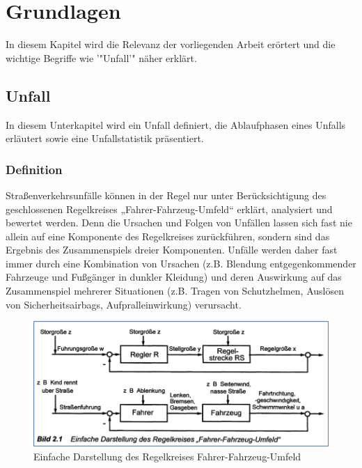 \chapter{Grundlagen}
In diesem Kapitel wird die Relevanz der vorliegenden Arbeit erörtert und die wichtige Begriffe wie '"Unfall'" näher erklärt.

%
%
\section{Unfall}
In diesem Unterkapitel wird ein Unfall definiert, die Ablaufphasen eines Unfalls erläutert sowie eine Unfallstatistik präsentiert.
%
%
%
%
\subsection{Definition}
Straßenverkehrsunfälle können in der Regel nur unter Berücksichtigung des geschlossenen Regelkreises „Fahrer-Fahrzeug-Umfeld“ erklärt, analysiert und bewertet werden. Denn die Ursachen und Folgen von Unfällen lassen sich fast nie allein auf eine Komponente des Regelkreises zurückführen, sondern sind das Ergebnis des Zusammenspiels dreier Komponenten. Unfälle werden daher fast immer durch eine Kombination von Ursachen (z.B. Blendung entgegenkommender Fahrzeuge und Fußgänger in dunkler Kleidung) und deren Auswirkung auf das Zusammenspiel mehrerer Situationen (z.B. Tragen von Schutzhelmen, Auslösen von Sicherheitsairbags, Aufpralleinwirkung) verursacht. \citep{Appel2002}

\begin{figure}[H]
	\centering
	\includegraphics[width=\linewidth]{Bilder/FahrenRegelkreis.png}
	\caption{Einfache Darstellung des Regelkreises 	\glqq Fahrer-Fahrzeug-Umfeld\grqq{} \citep{Appel2002}} %
	\label{fig:FahrenRegelkreis}
\end{figure}


